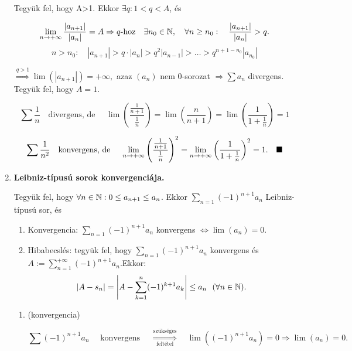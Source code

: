 \documentclass[a4paper,11.5pt]{article}
\begin{document}
\begin{enumerate}
		Tegyük fel, hogy A>1. Ekkor $\exists q: 1<q<A$, és
		
		\[\displaystyle\lim_{n\to +\infty} \frac{|a_{n+1}|}{|a_n|}=A \Rightarrow q\text{-hoz}\quad\exists n_0 \in \mathbb{N}, \quad \forall n\geq n_0: \quad \frac{|a_{n+1}|}{|a_n|}>q.\]
		\[n>n_0:\quad|a_{n+1}|>q\cdot|a_n|> q^2|a_{n-1}|> \ldots > q^{n+1-n_0}|a_{n_0}|\]
		
		$ \overset{q>1}{\Longrightarrow}\lim(|a_{n+1}|)=+\infty,$ azaz $(a_n)$ nem 0-sorozat $\Rightarrow \sum a_n$ divergens.\\
		
		Tegyük fel, hogy $A=1$.
		
		\[ \sum\frac{1}{n}\quad \text{divergens, de }\quad \lim\left(\frac{\frac{1}{n+1}}{\frac{1}{n}}\right)=\lim\left(\frac{n}{n+1}\right)=\lim\left(\frac{1}{1+\frac{1}{n}}\right)=1 \]
		
		\[ \sum\frac{1}{n^2}\quad \text{konvergens, de }\quad \displaystyle\lim_{n\to +\infty}\left(\frac{\frac{1}{n+1}}{\frac{1}{n}}\right)^2=\displaystyle\lim_{n\to +\infty}\left(\frac{1}{1+\frac{1}{n}}\right)^2=1. \quad\blacksquare \]
		\pagebreak
		\item \textbf{Leibniz-típusú sorok konvergenciája.}
		
		Tegyük fel, hogy $ \forall n \in \mathbb{N} : 0 \leq a_{n+1}\leq a_{n}$. Ekkor $\displaystyle\sum_{n=1} (-1)^{n+1} a_n$ Leibniz-típusú sor, és
		
		\begin{enumerate}
			\item Konvergencia: $\displaystyle\sum_{n=1} (-1)^{n+1} a_n$ konvergens $\Leftrightarrow \lim(a_n)=0$.
			
			\smallskip
			\item Hibabecslés: tegyük fel, hogy $\displaystyle\sum_{n=1} (-1)^{n+1} a_n$ konvergens és \\ $A:=\displaystyle \sum_{n=1}^{+\infty} (-1)^{n+1} a_n$.\quad 	Ekkor:
			\[|A-s_n|=\left|A-\displaystyle \sum_{k=1}^{n} (-1)^{k+1} a_k\right| \leq a_n~~ (\forall n \in \mathbb{N}).\]
		\end{enumerate}
		
		\biz 
		\begin{enumerate}
			\item (konvergencia)
			
		 \fbox{$\Rightarrow:$}
			\[ \sum (-1)^{n+1}a_n\quad \text{ konvergens } \quad\overset{\text{szükséges}}{\underset{\text{feltétel}}{\Longrightarrow}}\quad\lim\left((-1)^{n+1}a_n\right)=0 \Rightarrow \lim(a_n)=0. \]
			\fbox{$\Leftarrow:$}
			

\end{enumerate}
\end{enumerate}
\end{document}
